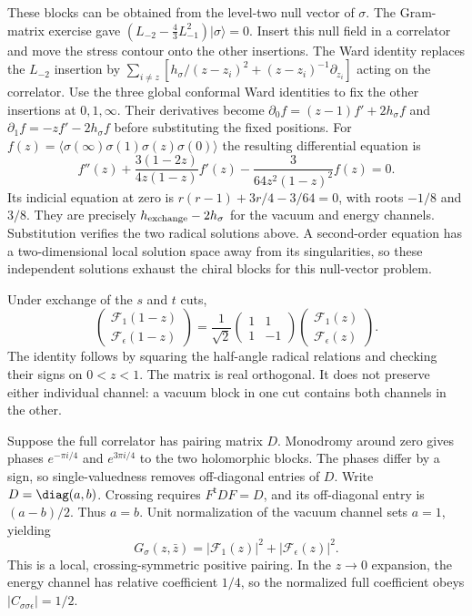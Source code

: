 These blocks can be obtained from the level-two null vector of
$\sigma$. The Gram-matrix exercise gave
$(L_{-2}-\tfrac43L_{-1}^2)|\sigma\rangle=0$.
Insert this null field in a correlator and move the stress contour
onto the other insertions. The Ward identity replaces the
$L_{-2}$ insertion by
$\sum_{i\ne z}[h_\sigma/(z-z_i)^2+
(z-z_i)^{-1}\partial_{z_i}]$ acting on the correlator.
Use the three global conformal Ward identities to fix the other
insertions at $0,1,\infty$. Their derivatives become
$\partial_0 f=(z-1)f'+2h_\sigma f$ and
$\partial_1 f=-zf'-2h_\sigma f$ before substituting the
fixed positions. For
$f(z)=\langle\sigma(\infty)\sigma(1)\sigma(z)\sigma(0)\rangle$
the resulting differential equation is
\begin{equation}
 f''(z)+\frac{3(1-2z)}{4z(1-z)}f'(z)
       -\frac{3}{64z^2(1-z)^2}f(z)=0.
 \label{eq:sewing-Ising-BPZ}
\end{equation}
Its indicial equation at zero is
$r(r-1)+3r/4-3/64=0$, with roots $-1/8$ and $3/8$.
They are precisely $h_{\rm exchange}-2h_\sigma$ for the
vacuum and energy channels. Substitution verifies the two
radical solutions above. A second-order equation has a
two-dimensional local solution space away from its singularities,
so these independent solutions exhaust the chiral blocks for
this null-vector problem.

Under exchange of the $s$ and $t$ cuts,
\begin{equation}
 \begin{pmatrix}\mathcal F_1(1-z)\\\mathcal F_\epsilon(1-z)\end{pmatrix}
 =\frac1{\sqrt2}
  \begin{pmatrix}1&1\\1&-1\end{pmatrix}
  \begin{pmatrix}\mathcal F_1(z)\\\mathcal F_\epsilon(z)\end{pmatrix}.
 \label{eq:sewing-Ising-F}
\end{equation}
The identity follows by squaring the half-angle radical relations
and checking their signs on $0<z<1$. The matrix is real orthogonal.
It does not preserve either individual channel: a vacuum block
in one cut contains both channels in the other.

Suppose the full correlator has pairing matrix $D$. Monodromy
around zero gives phases $e^{-\pi i/4}$ and $e^{3\pi i/4}$ to
the two holomorphic blocks. The phases differ by a sign, so
single-valuedness removes off-diagonal entries of $D$.
Write $D=\diag(a,b)$. Crossing requires
$F^{\mathsf t}DF=D$, and its off-diagonal entry is
$(a-b)/2$. Thus $a=b$. Unit normalization of the vacuum channel
sets $a=1$, yielding
\begin{equation}
 G_\sigma(z,\bar z)=|\mathcal F_1(z)|^2+
                              |\mathcal F_\epsilon(z)|^2.
 \label{eq:sewing-Ising-full}
\end{equation}
This is a local, crossing-symmetric positive pairing. In the
$z\to0$ expansion, the energy channel has relative coefficient
$1/4$, so the normalized full coefficient obeys
$|C_{\sigma\sigma\epsilon}|=1/2$.

